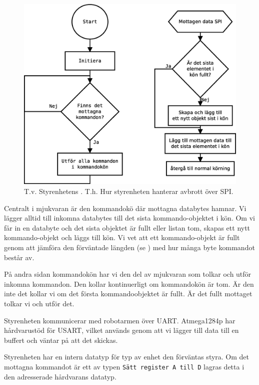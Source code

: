 \begin{figure}[h!]
	\centering
	\includegraphics[scale=0.4]{grafik/styr-mjukvara}
	\caption{T.v. Styrenhetens . T.h. Hur styrenheten hanterar avbrott över SPI.} \label{styr-mjukvara}
\end{figure}

Centralt i mjukvaran är den kommandokö där mottagna databytes hamnar. Vi lägger alltid till inkomna databytes till det sista kommando-objektet i kön. Om vi får in en databyte och det sista objektet är fullt eller listan tom, skapas ett nytt kommando-objekt och läggs till kön. Vi vet att ett kommando-objekt är fullt genom att jämföra den förväntade längden (se ) med hur många byte kommandot består av.

På andra sidan kommandokön har vi den del av mjukvaran som tolkar och utför inkomna kommandon. Den kollar kontinuerligt om kommandokön är tom. Är den inte det kollar vi om det första kommandoobjektet är fullt. Är det fullt mottaget tolkar vi och utför det.

Styrenheten kommunicerar med robotarmen över UART. Atmega1284p har hårdvarustöd för USART, vilket används genom att vi lägger till data till en buffert och väntar på att det skickas.

Styrenheten har en intern datatyp för typ av enhet den förväntas styra. Om det mottagna kommandot är ett av typen \texttt{Sätt register A till D} lagras detta i den adresserade hårdvarans datatyp.

